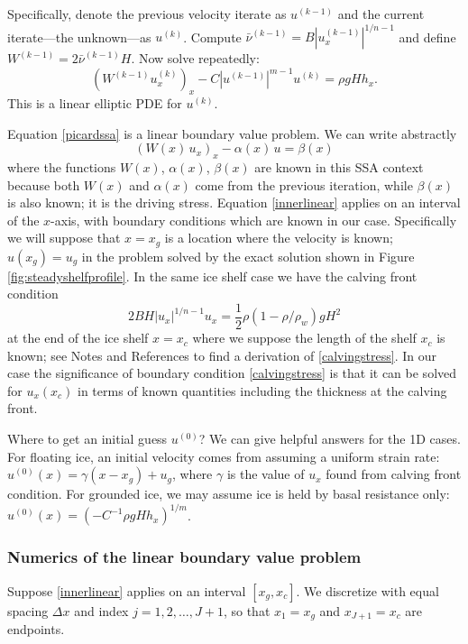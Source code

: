\documentclass[titlepage,letterpaper,final,12pt]{scrartcl}
\begin{document}
Specifically, denote the previous velocity iterate as $u^{(k-1)}$ and the current iterate---the unknown---as $u^{(k)}$.  Compute $\bar \nu^{(k-1)} = B |u^{(k-1)}_x|^{1/n-1}$ and define $W^{(k-1)} = 2 \bar \nu^{(k-1)} H$.  Now solve repeatedly:
\begin{equation}
   \left(W^{(k-1)} u^{(k)}_x\right)_x - C |u^{(k-1)}|^{m-1} u^{(k)} = \rho g H h_x. \label{picardssa}
\end{equation}
This is a linear elliptic PDE for $u^{(k)}$.

Equation \eqref{picardssa} is a linear boundary value problem.  We can write abstractly
\begin{equation}
  \left(W(x)\, u_x\right)_x - \alpha(x)\, u = \beta(x)  \label{innerlinear}
\end{equation}
where the functions $W(x)$, $\alpha(x)$, $\beta(x)$ are known in this SSA context because both $W(x)$ and $\alpha(x)$ come from the previous iteration, while $\beta(x)$ is also known; it is the driving stress.  Equation \eqref{innerlinear} applies on an interval of the $x$-axis, with boundary conditions which are known in our case.  Specifically we will suppose that $x=x_g$ is a location where the velocity is known; $u(x_g)=u_g$ in the problem solved by the exact solution shown in Figure \ref{fig:steadyshelfprofile}.  In the same ice shelf case we have the calving front condition
\begin{equation}
  2 B H |u_x|^{1/n - 1} u_x = \frac{1}{2}\rho (1-\rho/\rho_w) g H^2  \label{calvingstress}
\end{equation}
at the end of the ice shelf $x=x_c$ where we suppose the length of the shelf $x_c$ is known; see Notes and References to find a derivation of \eqref{calvingstress}.  In our case the significance of boundary condition \eqref{calvingstress} is that it can be solved for $u_x(x_c)$ in terms of known quantities including the thickness at the calving front.

Where to get an initial guess $u^{(0)}$?  We can give helpful answers for the 1D cases.  For floating ice, an initial velocity comes from assuming a uniform strain rate: $u^{(0)}(x) = \gamma (x-x_g) + u_g$, where $\gamma$ is the value of $u_x$ found from calving front condition.  For grounded ice, we may assume ice is held by basal resistance only: $u^{(0)}(x) = \left(-C^{-1} \rho g H h_x\right)^{1/m}$.

\subsubsection*{Numerics of the linear boundary value problem}  Suppose \eqref{innerlinear} applies on an interval $[x_g,x_c]$.  We discretize with equal spacing $\Delta x$ and index $j=1,2,\dots,J+1$, so that $x_1 = x_g$ and $x_{J+1} = x_c$ are endpoints.
\end{document}
